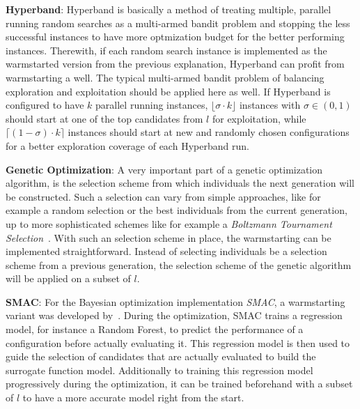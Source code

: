 \textbf{Hyperband}:
Hyperband is basically a method of treating multiple, parallel running random searches as a multi-armed bandit problem and stopping the less successful instances to have more optmization budget for the better performing instances.
Therewith, if each random search instance is implemented as the warmstarted version from the previous explanation, Hyperband can profit from warmstarting a well.\newline
The typical multi-armed bandit problem of balancing exploration and exploitation should be applied here as well.
If Hyperband is configured to have $k$ parallel running instances, $\lfloor \sigma \cdot k \rfloor$ instances with $\sigma \in (0,1)$ should start at one of the top candidates from $l$ for exploitation, while $\lceil (1 - \sigma) \cdot k \rceil$ instances should start at new and randomly chosen configurations for a better exploration coverage of each Hyperband run.

\textbf{Genetic Optimization}:
A very important part of a genetic optimization algorithm, is the selection scheme from which individuals the next generation will be constructed.
Such a selection can vary from simple approaches, like for example a random selection or the best individuals from the current generation, up to more sophisticated schemes like for example a \textit{Boltzmann Tournament Selection}~\cite{Goldberg-Boltzmann}.\newline
With such an selection scheme in place, the warmstarting can be implemented straightforward.
Instead of selecting individuals be a selection scheme from a previous generation, the selection scheme of the genetic algorithm will be applied on a subset of $l$.

\textbf{SMAC}:
For the Bayesian optimization implementation \textit{SMAC}, a warmstarting variant was developed by~\textcite{Lindauer-Smac-Warmstart}.
During the optimization, SMAC trains a regression model, for instance a Random Forest, to predict the performance of a configuration before actually evaluating it.
This regression model is then used to guide the selection of candidates that are actually evaluated to build the surrogate function model.
Additionally to training this regression model progressively during the optimization, it can be trained beforehand with a subset of $l$ to have a more accurate model right from the start.
